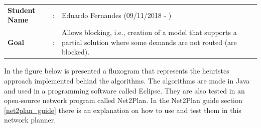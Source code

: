 \begin{tcolorbox}	
	\begin{tabular}{p{2.75cm} p{0.2cm} p{10.5cm}} 	
		\textbf{Student Name}   &:& Eduardo Fernandes    (09/11/2018 - )\\
		\textbf{Goal}           &:& Allows blocking, i.e., creation of a model that supports a partial solution where some demands are not routed (are blocked).
	\end{tabular}
\end{tcolorbox}

\vspace{11pt}
In the figure below is presented a fluxogram that represents the heuristcs approach implemented behind the algorithms. The algorithms are made in Java and used in a programming software called Eclipse. They are also tested in an open-source network program called Net2Plan. In the Net2Plan guide section \ref{net2plan_guide} there is an explanation on how to use and test them in this network planner.


